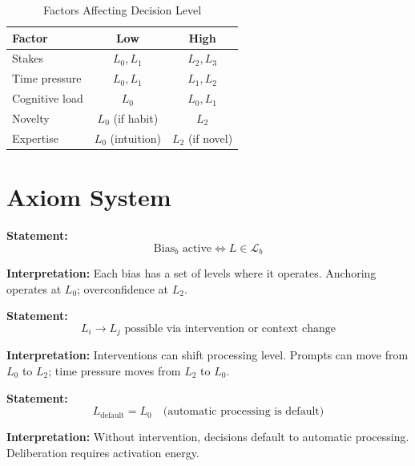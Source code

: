 \begin{table}[htbp]
\centering
\caption{Factors Affecting Decision Level}
\label{tab:hier-determinants}
\renewcommand{\arraystretch}{1.3}
\begin{tabular}{@{}lcc@{}}
\toprule
\textbf{Factor} & \textbf{Low} & \textbf{High} \\
\midrule
Stakes & $L_0, L_1$ & $L_2, L_3$ \\
Time pressure & $L_0, L_1$ & $L_1, L_2$ \\
Cognitive load & $L_0$ & $L_0, L_1$ \\
Novelty & $L_0$ (if habit) & $L_2$ \\
Expertise & $L_0$ (intuition) & $L_2$ (if novel) \\
\bottomrule
\end{tabular}
\end{table}

\section{Axiom System}
\label{sec:hier-axioms}

\begin{tcolorbox}[colback=gray!5!white, colframe=gray!75!black,
    title=Axiom HIE-1: Level-Bias Correspondence]
\textbf{Statement:}
\begin{equation}
\text{Bias}_b \text{ active} \Leftrightarrow L \in \mathcal{L}_b
\end{equation}

\textbf{Interpretation:} Each bias has a set of levels where it operates.
Anchoring operates at $L_0$; overconfidence at $L_2$.
\end{tcolorbox}

\begin{tcolorbox}[colback=gray!5!white, colframe=gray!75!black,
    title=Axiom HIE-2: Level Shifting]
\textbf{Statement:}
\begin{equation}
L_i \to L_j \text{ possible via intervention or context change}
\end{equation}

\textbf{Interpretation:} Interventions can shift processing level.
Prompts can move from $L_0$ to $L_2$; time pressure moves from $L_2$ to $L_0$.
\end{tcolorbox}

\begin{tcolorbox}[colback=gray!5!white, colframe=gray!75!black,
    title=Axiom HIE-3: Default Level]
\textbf{Statement:}
\begin{equation}
L_{\text{default}} = L_0 \quad \text{(automatic processing is default)}
\end{equation}

\textbf{Interpretation:} Without intervention, decisions default to automatic processing.
Deliberation requires activation energy.
\end{tcolorbox}

